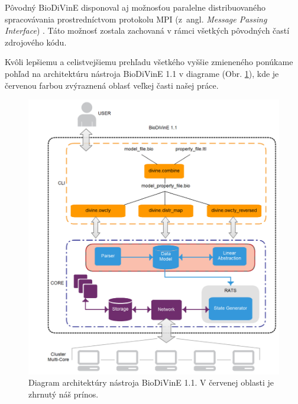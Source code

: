 \documentclass[11pt,final,oneside]{fithesis}
\begin{document}
P\^ ovodn\'y BioDiVinE disponoval aj mo\v znos\v tou paralelne distribuovan\'eho spracov\'avania prostredn\'ictvom protokolu MPI (z~angl. \textit{Message 
Passing Interface}) \cite{MPI}. T\'ato mo\v znos\v t zostala zachovan\'a v r\'amci v\v setk\'ych p\^ ovodn\'ych \v cast\'i zdrojov\'eho k\'odu.

Kv\^ oli lep\v siemu a celistvej\v siemu preh\v ladu v\v setk\'eho vy\v s\v sie zmienen\'eho pon\'ukame poh\v lad na architekt\'uru n\'astroja BioDiVinE 1.1 
v diagrame (Obr. \ref{fig:diagram}), kde je \v cervenou farbou zv\'yraznen\'a oblas\v t ve\v lkej \v casti na\v sej pr\'ace.

\begin{figure}[h]
\centering
\includegraphics[width=1\textwidth]{BiodivineArchitecture2.pdf}
\caption{Diagram architekt\'ury n\'astroja BioDiVinE 1.1. V \v cervenej oblasti je zhrnut\'y n\'a\v s pr\'inos.}
\label{fig:diagram}
\end{figure}

\end{document}
